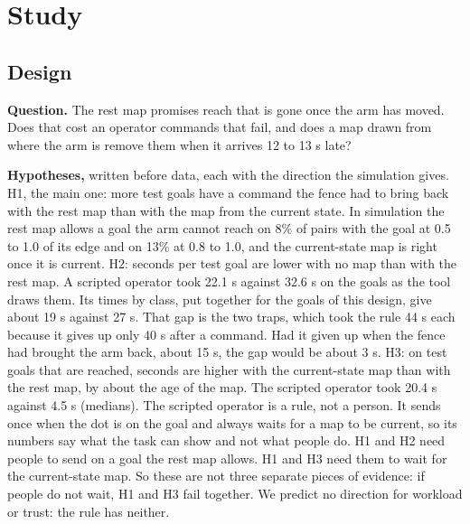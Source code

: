 \documentclass[pdflatex,sn-mathphys-num]{sn-jnl}
\begin{document}
\section{Study}
\subsection{Design}
\textbf{Question.} The rest map promises reach that is gone once the arm has moved. Does that cost an operator
commands that fail, and does a map drawn from where the arm is remove them when it arrives 12 to 13 s late?

\textbf{Hypotheses,} written before data, each with the direction the simulation gives.
H1, the main one: more test goals have a command the fence had to bring back with the rest map than with the map
from the current state. In simulation the rest map allows a goal the arm cannot reach on 8\% of pairs with the
goal at 0.5 to 1.0 of its edge and on 13\% at 0.8 to 1.0, and the current-state map is right once it is
current. %
H2: seconds per test goal are lower with no map than with the rest map. A scripted operator took 22.1 s against
32.6 s on the goals as the tool draws them. %
Its times by class, put together for the goals of this design, give about 19 s against 27 s. That gap is the two
traps, which took the rule 44 s each because it gives up only 40 s after a command. Had it given up when the
fence had brought the arm back, about 15 s, the gap would be about 3 s. %
H3: on test goals that are reached, seconds are higher with the current-state map than with the rest map, by
about the age of the map. The scripted operator took 20.4 s against 4.5 s (medians). %
The scripted operator is a rule, not a person. It sends once when the dot is on the goal and always waits for a
map to be current, so its numbers say what the task can show and not what people do. H1 and H2 need people to
send on a goal the rest map allows. H1 and H3 need them to wait for the current-state map. So these are not three
separate pieces of evidence: if people do not wait, H1 and H3 fail together. We predict no direction for workload
or trust: the rule has neither.
\end{document}

